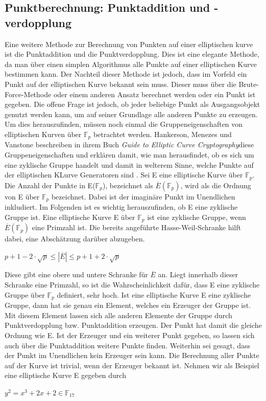\subsection{Punktberechnung: Punktaddition und -verdopplung}
Eine weitere Methode zur Berechnung von Punkten auf einer elliptischen kurve ist die Punktaddition und die Punktverdopplung. Dies ist eine elegante Methode, da man über einen simplen Algorithmus alle Punkte auf einer elliptischen Kurve bestimmen kann. Der Nachteil dieser Methode ist jedoch, dass im Vorfeld ein Punkt auf der elliptischen Kurve bekannt sein muss. Dieser muss über die Brute-Force-Methode oder einem anderen Ansatz berechnet werden oder ein Punkt ist gegeben. Die offene Frage ist jedoch, ob jeder beliebige Punkt als Ausgangsobjekt genutzt werden kann, um auf seiner Grundlage alle anderen Punkte zu erzeugen.\\

Um dies herauszufinden, müssen noch einmal die Gruppeneigenschaften von elliptischen Kurven über $\mathbb{F}_{p}$ betrachtet werden. Hankerson, Menezes und Vanstone beschreiben in ihrem Buch \glqq\textit{Guide to Elliptic Curve Cryptography}\grqq diese Gruppeneigenschaften und erklären damit, wie man herausfindet, ob es sich um eine zyklische Gruppe handelt und damit in welterem Sinne, welche Punkte auf der elliptischen KLurve Generatoren sind \cite[vgl.][S. 82-84]{Hankerson2004}. Sei E eine elliptische Kurve über $\mathbb{F}_{p}$. Die Anzahl der Punkte in E($\mathbb{F}_{p}$), bezeichnet als
$\overline{E}(\mathbb{F}_{p})$, wird als die Ordnung von E über $\mathbb{F}_{p}$ bezeichnet. Dabei ist der imaginäre Punkt im Unendlichen inkludiert. Im Folgenden ist es wichtig herauszufinden, ob E eine zyklische Gruppe ist. Eine elliptische Kurve E über $\mathbb{F}_{p}$ ist eine zyklische Gruppe, wenn $\overline{E}(\mathbb{F}_{p})$ eine Primzahl ist. Die bereits angeführte Hasse-Weil-Schranke hilft dabei, eine Abschätzung darüber abzugeben.
\begin{center}
$p + 1 - 2 \cdot \sqrt{p} \leq | \overline{E} | \leq p + 1 + 2 \cdot \sqrt{p}$
\end{center} 

Diese gibt eine obere und untere Schranke für $\overline{E}$ an. Liegt innerhalb dieser Schranke eine Primzahl, so ist die Wahrscheinlichkeit dafür, dass E eine zyklische Gruppe über $\mathbb{F}_{p}$ definiert, sehr hoch. Ist eine elliptische Kurve E eine zyklische Gruppe, dann hat sie genau ein Element, welches ein Erzeuger der Gruppe ist. Mit diesem Element lassen sich alle anderen Elemente der Gruppe durch Punktverdopplung bzw. Punktaddition erzeugen. Der Punkt hat damit die gleiche Ordnung wie E. Ist der Erzeuger und ein weiterer Punkt gegeben, so lassen sich auch über die Punktaddition weitere Punkte finden. Weiterhin sei gesagt, dass der Punkt im Unendlichen kein Erzeuger sein kann. Die Berechnung aller Punkte auf der Kurve ist trivial, wenn der Erzeuger bekannt ist. Nehmen wir als Beispiel eine elliptische Kurve E gegeben durch
\begin{center}
$y^{2} =  x^{3} + 2x + 2 \in \mathbb{F}_{17}$
\end{center}

